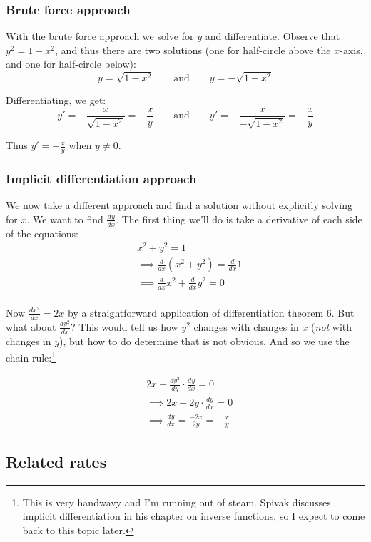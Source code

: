 \subsubsection*{Brute force approach}
With the brute force approach we solve for $y$ and differentiate.
Observe that $y^2=1-x^2$, and thus there are two solutions (one for
half-circle above the $x$-axis, and one for half-circle below):
\[y=\sqrt{1-x^2}\qquad\text{and}\qquad y=-\sqrt{1-x^2}\]

Differentiating, we get:
\[y'=-\frac{x}{\sqrt{1-x^2}}=-\frac{x}{y}\qquad\text{and}\qquad
  y'=-\frac{x}{-\sqrt{1-x^2}}=-\frac{x}{y}\]

Thus $y'=-\frac{x}{y}$ when $y\neq0$.

\subsubsection*{Implicit differentiation approach}
We now take a different approach and find a solution without
explicitly solving for $x$. We want to find $\frac{dy}{dx}$. The first
thing we'll do is take a derivative of each side of the equations:
\begin{align*}
  &x^2+y^2=1\\
  &\implies \frac{d}{dx}(x^2+y^2)=\frac{d}{dx}1\\
  &\implies \frac{d}{dx}x^2+\frac{d}{dx}y^2=0\\
\end{align*}

Now $\frac{dx^2}{dx}=2x$ by a straightforward application of
differentiation theorem 6. But what about $\frac{dy^2}{dx}$? This
would tell us how $y^2$ changes with changes in $x$ (\textit{not} with
changes in $y$), but how to do determine that is not obvious. And so
we use the chain rule:\footnote{This is very handwavy and I'm running
  out of steam. Spivak discusses implicit differentiation in his
  chapter on inverse functions, so I expect to come back to this topic
later.}

\begin{align*}
  &2x+\frac{dy^2}{dy}\cdot \frac{dy}{dx}=0\\
  &\implies 2x+2y\cdot \frac{dy}{dx}=0\\
  &\implies \frac{dy}{dx}=\frac{-2x}{2y}=-\frac{x}{y}
\end{align*}

\subsection{Related rates}


